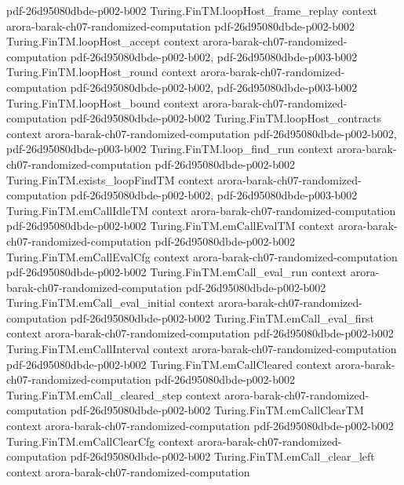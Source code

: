 \begin{theorem}
  {pdf-26d95080dbde-p002-b002}
\proofstep
  {Turing.FinTM.loopHost_frame_replay}
  {context}
  {arora-barak-ch07-randomized-computation}
  {pdf-26d95080dbde-p002-b002}
\proofstep
  {Turing.FinTM.loopHost_accept}
  {context}
  {arora-barak-ch07-randomized-computation}
  {pdf-26d95080dbde-p002-b002,
    pdf-26d95080dbde-p003-b002}
\proofstep
  {Turing.FinTM.loopHost_round}
  {context}
  {arora-barak-ch07-randomized-computation}
  {pdf-26d95080dbde-p002-b002,
    pdf-26d95080dbde-p003-b002}
\proofstep
  {Turing.FinTM.loopHost_bound}
  {context}
  {arora-barak-ch07-randomized-computation}
  {pdf-26d95080dbde-p002-b002}
\proofstep
  {Turing.FinTM.loopHost_contracts}
  {context}
  {arora-barak-ch07-randomized-computation}
  {pdf-26d95080dbde-p002-b002,
    pdf-26d95080dbde-p003-b002}
\proofstep
  {Turing.FinTM.loop_find_run}
  {context}
  {arora-barak-ch07-randomized-computation}
  {pdf-26d95080dbde-p002-b002}
\proofstep
  {Turing.FinTM.exists_loopFindTM}
  {context}
  {arora-barak-ch07-randomized-computation}
  {pdf-26d95080dbde-p002-b002,
    pdf-26d95080dbde-p003-b002}
\proofstep
  {Turing.FinTM.emCallIdleTM}
  {context}
  {arora-barak-ch07-randomized-computation}
  {pdf-26d95080dbde-p002-b002}
\proofstep
  {Turing.FinTM.emCallEvalTM}
  {context}
  {arora-barak-ch07-randomized-computation}
  {pdf-26d95080dbde-p002-b002}
\proofstep
  {Turing.FinTM.emCallEvalCfg}
  {context}
  {arora-barak-ch07-randomized-computation}
  {pdf-26d95080dbde-p002-b002}
\proofstep
  {Turing.FinTM.emCall_eval_run}
  {context}
  {arora-barak-ch07-randomized-computation}
  {pdf-26d95080dbde-p002-b002}
\proofstep
  {Turing.FinTM.emCall_eval_initial}
  {context}
  {arora-barak-ch07-randomized-computation}
  {pdf-26d95080dbde-p002-b002}
\proofstep
  {Turing.FinTM.emCall_eval_first}
  {context}
  {arora-barak-ch07-randomized-computation}
  {pdf-26d95080dbde-p002-b002}
\proofstep
  {Turing.FinTM.emCallInterval}
  {context}
  {arora-barak-ch07-randomized-computation}
  {pdf-26d95080dbde-p002-b002}
\proofstep
  {Turing.FinTM.emCallCleared}
  {context}
  {arora-barak-ch07-randomized-computation}
  {pdf-26d95080dbde-p002-b002}
\proofstep
  {Turing.FinTM.emCall_cleared_step}
  {context}
  {arora-barak-ch07-randomized-computation}
  {pdf-26d95080dbde-p002-b002}
\proofstep
  {Turing.FinTM.emCallClearTM}
  {context}
  {arora-barak-ch07-randomized-computation}
  {pdf-26d95080dbde-p002-b002}
\proofstep
  {Turing.FinTM.emCallClearCfg}
  {context}
  {arora-barak-ch07-randomized-computation}
  {pdf-26d95080dbde-p002-b002}
\proofstep
  {Turing.FinTM.emCall_clear_left}
  {context}
  {arora-barak-ch07-randomized-computation}

\end{theorem}
